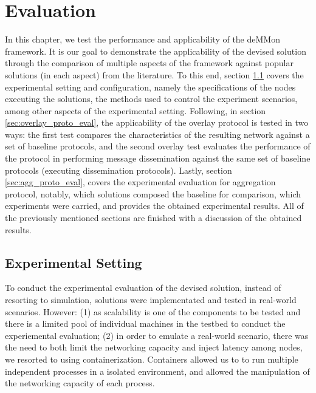 

\chapter{Evaluation}
\label{cha:evaluation}

In this chapter, we test the performance and applicability of the deMMon framework. It is our goal to demonstrate the applicability of the devised solution through the comparison of multiple aspects of the framework against popular solutions (in each aspect) from the literature. To this end, section \ref{sec:exp_setting_conf} covers the experimental setting and configuration, namely the specifications of the nodes executing the solutions, the methods used to control the experiment scenarios, among other aspects of the experimental setting. Following, in section \ref{sec:overlay_proto_eval}, the applicability of the overlay protocol is tested in two ways: the first test compares the characteristics of the resulting network against a set of baseline protocols, and the second overlay test evaluates the performance of the protocol in performing message dissemination against the same set of baseline protocols (executing dissemination protocols). Lastly, section \ref{sec:agg_proto_eval}, covers the experimental evaluation for aggregation protocol, notably, which solutions composed the baseline for comparison, which experiments were carried, and provides the obtained experimental results. All of the previously mentioned sections are finished with a discussion of the obtained results.

\section{Experimental Setting} \label{sec:exp_setting_conf}

To conduct the experimental evaluation of the devised solution, instead of resorting to simulation, solutions were implementated and tested in real-world scenarios. However: (1) as scalability is one of the components to be tested and there is a limited pool of individual machines in the testbed to conduct the experiemental evaluation; (2) in order to emulate a real-world scenario, there was the need to both limit the networking capacity and inject latency among nodes, we resorted to using containerization. Containers allowed us to to run multiple independent processes in a isolated environment, and allowed the manipulation of the networking capacity of each process. 

